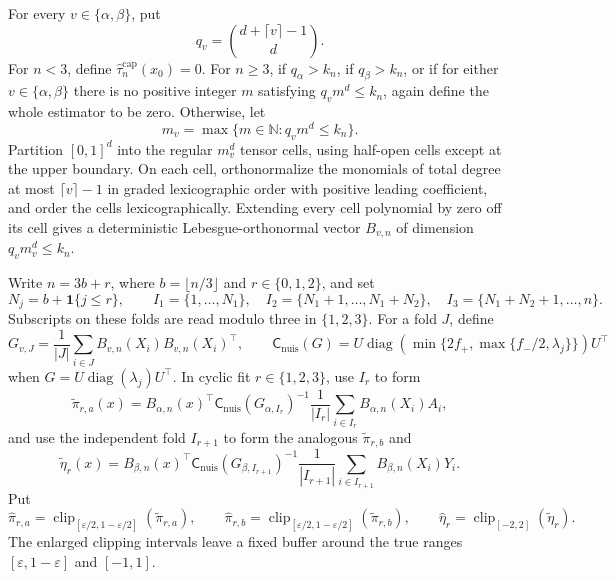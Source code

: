 For every \(v\in\{\alpha,\beta\}\), put
\[
q_v=\binom{d+\lceil v\rceil-1}{d}.
\]
For \(n<3\), define \(\widehat\tau_n^{\mathrm{cap}}(x_0)=0\).  For
\(n\geq3\), if \(q_\alpha>k_n\), if \(q_\beta>k_n\), or if for either
\(v\in\{\alpha,\beta\}\) there is no positive integer \(m\) satisfying
\(q_vm^d\leq k_n\), again define the whole estimator to be zero.  Otherwise,
let
\[
m_v=\max\{m\in\mathbb N:q_vm^d\leq k_n\}.
\]
Partition \([0,1]^d\) into the regular \(m_v^d\) tensor cells, using
half-open cells except at the upper boundary.  On each cell, orthonormalize
the monomials of total degree at most \(\lceil v\rceil-1\) in graded
lexicographic order with positive leading coefficient, and order the cells
lexicographically.  Extending every cell polynomial by zero off its cell
gives a deterministic Lebesgue-orthonormal vector \(B_{v,n}\) of dimension
\(q_vm_v^d\leq k_n\).

Write \(n=3b+r\), where \(b=\lfloor n/3\rfloor\) and
\(r\in\{0,1,2\}\), and set
\[
N_j=b+\mathbf 1\{j\leq r\},\qquad
I_1=\{1,\ldots,N_1\},\quad
I_2=\{N_1+1,\ldots,N_1+N_2\},\quad
I_3=\{N_1+N_2+1,\ldots,n\}.
\]
Subscripts on these folds are read modulo three in \(\{1,2,3\}\).  For a
fold \(J\), define
\[
G_{v,J}=\frac1{|J|}\sum_{i\in J}B_{v,n}(X_i)B_{v,n}(X_i)^\top,
\qquad
\mathsf C_{\mathrm{nuis}}(G)
=U\operatorname{diag}\!\left(
\min\{2f_+,\max\{f_-/2,\lambda_j\}\}
\right)U^\top
\]
when \(G=U\operatorname{diag}(\lambda_j)U^\top\).  In cyclic fit
\(r\in\{1,2,3\}\), use \(I_r\) to form
\[
\widetilde\pi_{r,a}(x)=B_{\alpha,n}(x)^\top
\mathsf C_{\mathrm{nuis}}(G_{\alpha,I_r})^{-1}
\frac1{|I_r|}\sum_{i\in I_r}B_{\alpha,n}(X_i)A_i,
\]
and use the independent fold \(I_{r+1}\) to form the analogous
\(\widetilde\pi_{r,b}\) and
\[
\widetilde\eta_r(x)=B_{\beta,n}(x)^\top
\mathsf C_{\mathrm{nuis}}(G_{\beta,I_{r+1}})^{-1}
\frac1{|I_{r+1}|}\sum_{i\in I_{r+1}}B_{\beta,n}(X_i)Y_i.
\]
Put
\[
\widehat\pi_{r,a}=\operatorname{clip}_{[\varepsilon/2,1-\varepsilon/2]}
(\widetilde\pi_{r,a}),\qquad
\widehat\pi_{r,b}=\operatorname{clip}_{[\varepsilon/2,1-\varepsilon/2]}
(\widetilde\pi_{r,b}),\qquad
\widehat\eta_r=\operatorname{clip}_{[-2,2]}(\widetilde\eta_r).
\]
The enlarged clipping intervals leave a fixed buffer around the true ranges
\([\varepsilon,1-\varepsilon]\) and \([-1,1]\).

